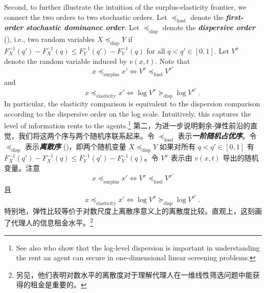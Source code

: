 \documentclass[12pt,letterpaper]{article}
\newenvironment{original}{\color{black}\noindent}{}
\newenvironment{translation}{\color{blue}\noindent}{}
\theoremstyle{plain}
\theoremstyle{definition}
\theoremstyle{remark}
\renewcommand{\1}{\mathds{1}}
\theoremstyle{definition}
\begin{document}
\begin{original}
Second, to further illustrate the intuition of the surplus-elasticity frontier, we connect the two orders to two stochastic orders. Let $\preceq_{\text{fosd}}$ denote the \textit{\textbf{first-order stochastic dominance order}}. Let $\preceq_{\text{disp}}$ denote the \textit{\textbf{dispersive order}} (\citealt{muller2002comparison}), i.e., two random variables $X \preceq_{\text{disp}} Y$ if $F^{-1}_X(q') - F^{-1}_X(q) \leq F^{-1}_Y(q') - F^{-1}_Y(q)$ for all $q < q' \in [0, 1]$. Let $V^x$ denote the random variable induced by $v(x, t)$. Note that
\[x \preceq_{\text{surplus}} x'  \iff V^x \preceq_{\text{fosd}} V^{x'}\]
and
\[\qquad \, \, \,\, x \preceq_{\text{elasticity}} x'  \iff \log V^{x} \succeq_{\text{disp}} \log V^{x'}\,.\]
In particular, the elasticity comparison is equivalent to the dispersion comparison according to the dispersive order on the log scale. Intuitively, this captures the level of information rents to the agents.\footnote{See also \citet*{yang2023comparison} who show that the log-level dispersion is important in understanding the rent an agent can secure in one-dimensional linear screening problems.}
\end{original}
\begin{translation}
第二，为进一步说明剩余-弹性前沿的直觉，我们将这两个序与两个随机序联系起来。令 $\preceq_{\text{fosd}}$ 表示\textit{\textbf{一阶随机占优序}}。令 $\preceq_{\text{disp}}$ 表示\textit{\textbf{离散序}} (\citealt{muller2002comparison})，即两个随机变量 $X \preceq_{\text{disp}} Y$ 如果对所有 $q < q' \in [0, 1]$ 有 $F^{-1}_X(q') - F^{-1}_X(q) \leq F^{-1}_Y(q') - F^{-1}_Y(q)$。令 $V^x$ 表示由 $v(x, t)$ 导出的随机变量。注意
\[x \preceq_{\text{surplus}} x'  \iff V^x \preceq_{\text{fosd}} V^{x'}\]
且
\[\qquad \, \, \,\, x \preceq_{\text{elasticity}} x'  \iff \log V^{x} \succeq_{\text{disp}} \log V^{x'}\,.\]
特别地，弹性比较等价于对数尺度上离散序意义上的离散度比较。直观上，这刻画了代理人的信息租金水平。\footnote{另见\citet*{yang2023comparison}，他们表明对数水平的离散度对于理解代理人在一维线性筛选问题中能获得的租金是重要的。}
\end{translation}
\end{document}
